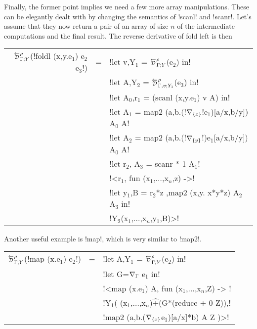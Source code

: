 Finally, the former point implies we need a few more array manipulations.
These can be elegantly dealt with by changing the semantics of !scanl! and !scanr!. 
Let's assume that they now return a pair of an array of size $n$ 
of the intermediate computations and the final result.
The reverse derivative of fold left is then

\begin{center}
\begin{tabular}{r c l}
    $\directD{\rho}{\Gamma}{Y}$(!foldl (x,y.e$_1$) e$_2$ e$_3$!) &=&
            !let v,Y$_1$ = $\directD{\rho}{\Gamma}{Y}$(e$_2$) in! \\
            && !let A,Y$_2$ = $\directD{\rho}{\Gamma,v}{Y_1}$(e$_3$) in! \\
            && !let A$_0$,r$_1$ = (scanl (x,y.e$_1$) v A) in! \\
            && !let A$_1$ = map2 (a,b.(!$\nabla_{\{x\}}$!e$_1$)[a/x,b/y]) A$_0$ A! \\
            && !let A$_2$ = map2 (a,b.(!$\nabla_{\{y\}}$!)e$_1$[a/x,b/y]) A$_0$ A! \\
            && !let r$_2$, A$_3$ = scanr * 1 A$_1$! \\
            && !<r$_1$, fun (x$_1$,$\ldots$,x$_n$,z) ->! \\
            && !let y$_1$,B = r$_2$*z ,map2 (x,y. x*y*z) A$_2$ A$_3$ in! \\
            && !Y$_2$(x$_1$,$\ldots$,x$_n$,y$_1$,B)>! \\
\end{tabular}
\end{center}

Another useful example is !map!, which is very similar to !map2!.

\begin{center}
    \begin{tabular}{r c l}
        $\directD{\rho}{\Gamma}{Y}$(!map (x.e$_{1}$) e$_{2}$!) &=&  
            !let A,Y$_{1}$ = $\directD{\rho}{\Gamma}{Y}$(e$_{2}$) in! \\
            && !let G=$\nabla_{\Gamma}$ e$_{1}$ in!\\
            && !<map (x.e$_{1}$) A, fun (x$_{1}$,$\ldots$,x$_n$,Z) -> !\\
            && !Y$_{1}$( (x$_{1}$,$\ldots$,x$_n$)$\widehat{+}$(G*(reduce + 0 Z)),!\\
            && \quad\quad !map2 (a,b.($\nabla_{\{x\}}$e$_{1}$)[a/x]*b) A Z )>!\\
    \end{tabular}
\end{center}

